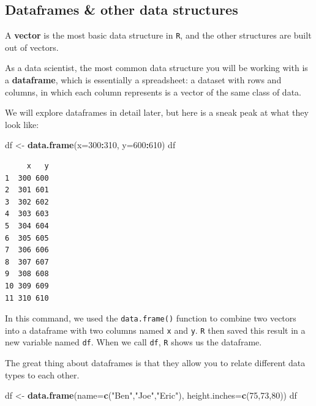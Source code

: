 \documentclass[
]{book}
\newenvironment{Shaded}{\begin{snugshade}}{\end{snugshade}}
\newcommand{\DataTypeTok}[1]{\textcolor[rgb]{0.13,0.29,0.53}{#1}}
\newcommand{\DecValTok}[1]{\textcolor[rgb]{0.00,0.00,0.81}{#1}}
\newcommand{\KeywordTok}[1]{\textcolor[rgb]{0.13,0.29,0.53}{\textbf{#1}}}
\newcommand{\NormalTok}[1]{#1}
\newcommand{\OperatorTok}[1]{\textcolor[rgb]{0.81,0.36,0.00}{\textbf{#1}}}
\newcommand{\StringTok}[1]{\textcolor[rgb]{0.31,0.60,0.02}{#1}}
\begin{document}
\hypertarget{dataframes-other-data-structures}{%
\subsection*{Dataframes \& other data structures}\label{dataframes-other-data-structures}}

A \textbf{vector} is the most basic data structure in \texttt{R}, and the other structures are built out of vectors.

As a data scientist, the most common data structure you will be working with is a \textbf{dataframe}, which is essentially a spreadsheet: a dataset with rows and columns, in which each column represents is a vector of the same class of data.

We will explore dataframes in detail later, but here is a sneak peak at what they look like:

\begin{Shaded}
\begin{Highlighting}[]
\NormalTok{df <-}\StringTok{ }\KeywordTok{data.frame}\NormalTok{(}\DataTypeTok{x=}\DecValTok{300}\OperatorTok{:}\DecValTok{310}\NormalTok{,}
           \DataTypeTok{y=}\DecValTok{600}\OperatorTok{:}\DecValTok{610}\NormalTok{)}
\NormalTok{df}
\end{Highlighting}
\end{Shaded}

\begin{verbatim}
     x   y
1  300 600
2  301 601
3  302 602
4  303 603
5  304 604
6  305 605
7  306 606
8  307 607
9  308 608
10 309 609
11 310 610
\end{verbatim}

In this command, we used the \texttt{data.frame()} function to combine two vectors into a dataframe with two columns named \texttt{x} and \texttt{y}. \texttt{R} then saved this result in a new variable named \texttt{df}. When we call \texttt{df}, \texttt{R} shows us the dataframe.

The great thing about dataframes is that they allow you to relate different data types to each other.

\begin{Shaded}
\begin{Highlighting}[]
\NormalTok{df <-}\StringTok{ }\KeywordTok{data.frame}\NormalTok{(}\DataTypeTok{name=}\KeywordTok{c}\NormalTok{(}\StringTok{"Ben"}\NormalTok{,}\StringTok{"Joe"}\NormalTok{,}\StringTok{"Eric"}\NormalTok{),}
                 \DataTypeTok{height.inches=}\KeywordTok{c}\NormalTok{(}\DecValTok{75}\NormalTok{,}\DecValTok{73}\NormalTok{,}\DecValTok{80}\NormalTok{))}
\NormalTok{df}
\end{Highlighting}
\end{Shaded}
\end{document}
